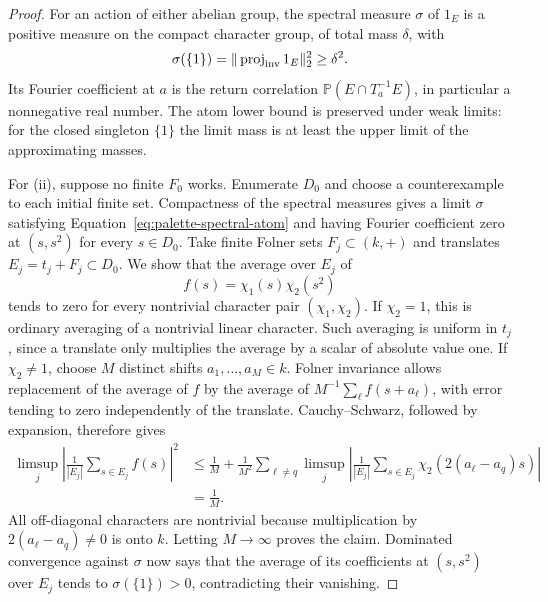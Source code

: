 \begin{proof}
For an action of either abelian group, the spectral measure $\sigma$ of
$1_E$ is a positive measure on the compact character group, of total
mass $\delta$, with
\begin{equation}\label{eq:palette-spectral-atom}
 \sigma(\{1\})=\|\operatorname{proj}_{\rm inv}1_E\|_2^2
 \geq\delta^2.
\end{equation}
Its Fourier coefficient at $a$ is the return correlation
$\mathbb P(E\cap T_a^{-1}E)$, in particular a nonnegative real number.
The atom lower bound is preserved under weak limits: for the closed
singleton $\{1\}$ the limit mass is at least the upper limit of the
approximating masses.

For \textup{(ii)}, suppose no finite $F_0$ works. Enumerate $D_0$ and
choose a counterexample to each initial finite set. Compactness of the
spectral measures gives a limit $\sigma$ satisfying
Equation~\ref{eq:palette-spectral-atom} and having Fourier coefficient
zero at $(s,s^2)$ for every $s\in D_0$.
Take finite Folner sets $F_j\subset(k,+)$ and translates
$E_j=t_j+F_j\subset D_0$. We show that the average over $E_j$ of
\[
 f(s)=\chi_1(s)\chi_2(s^2)
\]
tends to zero for every nontrivial character pair $(\chi_1,\chi_2)$.
If $\chi_2=1$, this is ordinary averaging of a nontrivial linear
character. Such averaging is uniform in $t_j$, since a translate only
multiplies the average by a scalar of absolute value one.
If $\chi_2\ne1$, choose $M$ distinct shifts $a_1,\ldots,a_M\in k$.
Folner invariance allows replacement of the average of $f$ by the
average of $M^{-1}\sum_\ell f(s+a_\ell)$, with error tending to zero
independently of the translate. Cauchy--Schwarz, followed by expansion,
therefore gives
\begin{align*}
 \limsup_j\left|\frac1{|E_j|}\sum_{s\in E_j}f(s)\right|^2
 &\leq\frac1M+
 \frac1{M^2}\sum_{\ell\ne q}
 \limsup_j\left|\frac1{|E_j|}\sum_{s\in E_j}
 \chi_2(2(a_\ell-a_q)s)\right|\\
 &=\frac1M.
\end{align*}
All off-diagonal characters are nontrivial because multiplication by
$2(a_\ell-a_q)\ne0$ is onto $k$. Letting $M\to\infty$ proves the
claim. Dominated convergence against $\sigma$ now says that the average
of its coefficients at $(s,s^2)$ over $E_j$ tends to
$\sigma(\{1\})>0$, contradicting their vanishing.


\end{proof}
